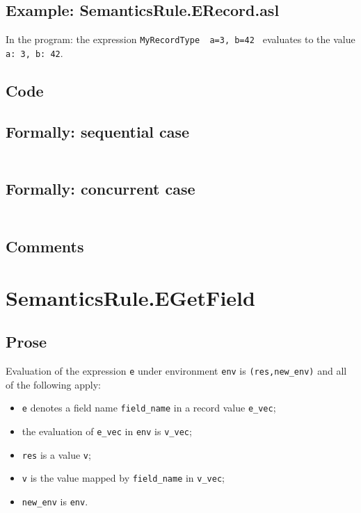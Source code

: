 \documentclass{book}
\begin{document}
  \subsection{Example: SemanticsRule.ERecord.asl}
    In the program:
    the expression \texttt{MyRecordType { a=3, b=42 }} evaluates to the value \texttt{{a:
3, b: 42}}.

  \subsection{Code}

  \subsection{Formally: sequential case}
  \begin{align}
  \end{align} 

  \subsection{Formally: concurrent case}
  \begin{align}
  \end{align} 

  \subsection{Comments}

\section{SemanticsRule.EGetField \label{sec:SemanticsRule.EGetField}}

  \subsection{Prose}
  Evaluation of the expression \texttt{e} under environment \texttt{env} is
  \texttt{(res,new\_env)} and all of the following apply:
  \begin{itemize}
  \item \texttt{e} denotes a field name \texttt{field\_name} in a record value \texttt{e\_vec};
  \item the evaluation of \texttt{e\_vec} in \texttt{env} is \texttt{v\_vec};
  \item \texttt{res} is a value \texttt{v};
  \item \texttt{v} is the value mapped by \texttt{field\_name} in \texttt{v\_vec};
  \item \texttt{new\_env} is \texttt{env}.
  \end{itemize}
\end{document}
